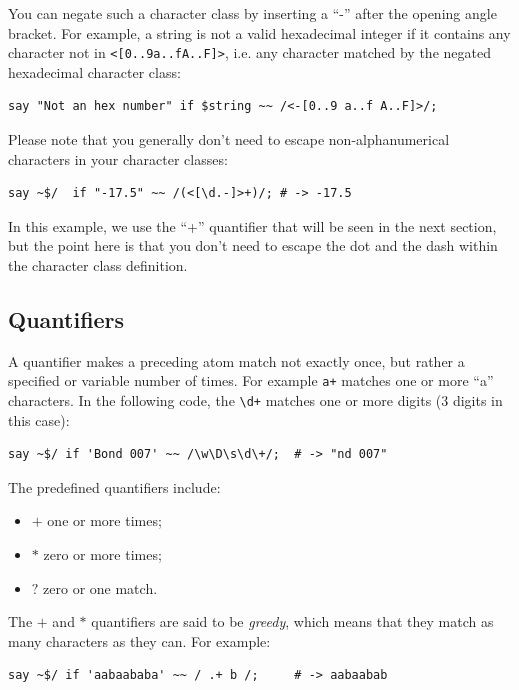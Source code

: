 You can negate such a character class by inserting a ``-'' after 
the opening angle bracket. For example, a string is not a 
valid hexadecimal integer if it contains any character not 
in \verb'<[0..9a..fA..F]>', i.e. any character matched by the 
negated hexadecimal character class:

\begin{verbatim}
say "Not an hex number" if $string ~~ /<-[0..9 a..f A..F]>/;
\end{verbatim}

Please note that you generally don't need to escape 
non-alphanumerical characters in your character classes:

\begin{verbatim}
say ~$/  if "-17.5" ~~ /(<[\d.-]>+)/; # -> -17.5
\end{verbatim}

In this example, we use the ``+'' quantifier that will be seen 
in the next section, but the point here is that you don't need 
to escape the dot and the dash within the character class 
definition.

\subsection{Quantifiers}

A quantifier makes a preceding atom match not exactly once, 
but rather a specified or variable number of times. For 
example \verb'a+' matches one or more ``a'' characters. In 
the following code, the \verb'\d+' matches one or more 
digits (3 digits in this case):

\begin{verbatim}
say ~$/ if 'Bond 007' ~~ /\w\D\s\d\+/;  # -> "nd 007"
\end{verbatim}
%

The predefined quantifiers include:
\begin{itemize}
\item $+$ one or more times;
\item $*$ zero or more times;
\item $?$ zero or one match.
\end{itemize}

The $+$ and $*$ quantifiers are said to be \emph{greedy}, 
which means that they match as many characters as they 
can. For example:

\begin{verbatim}
say ~$/ if 'aabaababa' ~~ / .+ b /;     # -> aabaabab
\end{verbatim}
%

